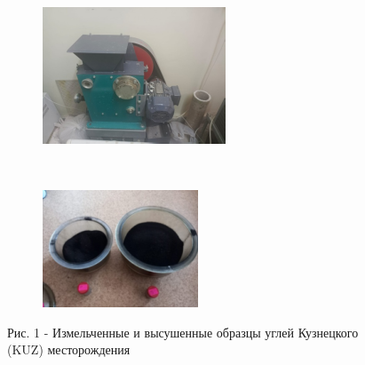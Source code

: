 \begin{figure}[H]
    \centering
    \begin{subfigure}[b]{0.45\textwidth}
        \centering
        \includegraphics[width=\textwidth]{media/gorn3/image2}
    \end{subfigure}
    ~
    \begin{subfigure}[b]{0.45\textwidth}
        \centering
        \includegraphics[width=\textwidth]{media/gorn3/image3}
    \end{subfigure}
    \caption*{Рис. 1 - Измельченные и высушенные образцы углей Кузнецкого (KUZ) месторождения}
\end{figure}

